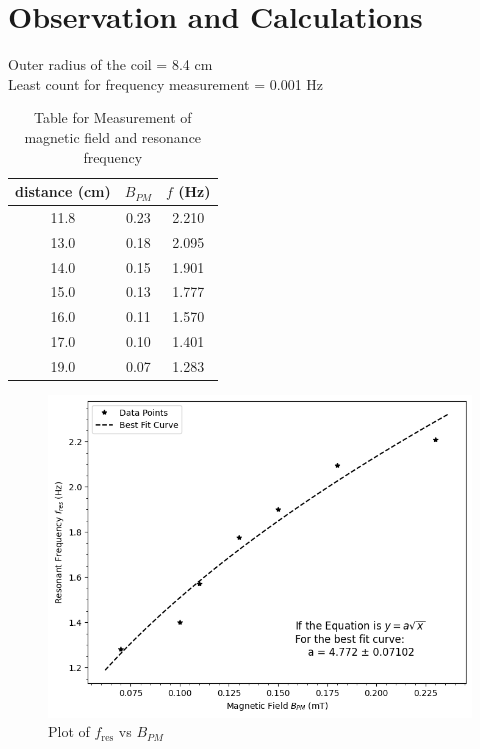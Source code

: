 \section{Observation and Calculations}
Outer radius of the coil = 8.4 cm\\
Least count for frequency measurement = 0.001 Hz

\begin{table}[H]
    \centering
        \caption{Table for Measurement of magnetic field and resonance frequency}
        \begin{tabular}{|c|c|c|} \hline
        distance (cm) & $B_{PM}$ & $f$ (Hz)\\ \hline
        11.8   & 0.23 & 2.210 \\
        13.0   & 0.18 & 2.095 \\
        14.0   & 0.15 & 1.901 \\
        15.0   & 0.13 & 1.777 \\
        16.0   & 0.11 & 1.570 \\
        17.0   & 0.10 & 1.401 \\
        19.0   & 0.07 & 1.283 \\ \hline
    \end{tabular}    
    \label{tab}
\end{table}

\begin{figure}[H]
    \centering
    \includegraphics[width=1\columnwidth]{images/g.png}
    \caption{Plot of $f_\text{res}$ vs $B_{PM}$}
    \label{g}
\end{figure}